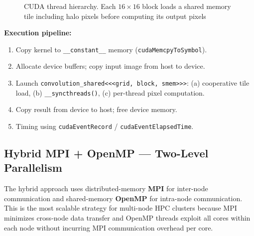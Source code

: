 ﻿\documentclass[12pt,a4paper]{article}
\begin{document}
\begin{figure}[H]

\caption{
CUDA thread hierarchy. Each $16 \times 16$ block loads a shared memory
tile including halo pixels before computing its output pixels
}

\label{fig:cuda}
\end{figure}

\textbf{Execution pipeline:}
\begin{enumerate}
  \item Copy kernel to \texttt{\_\_constant\_\_} memory
        (\texttt{cudaMemcpyToSymbol}).
  \item Allocate device buffers; copy input image from host to device.
  \item Launch \texttt{convolution\_shared<<<grid, block, smem>>>}:
        (a) cooperative tile load, (b) \texttt{\_\_syncthreads()},
        (c) per-thread pixel computation.
  \item Copy result from device to host; free device memory.
  \item Timing using \texttt{cudaEventRecord} / \texttt{cudaEventElapsedTime}.
\end{enumerate}

\subsection{Hybrid MPI + OpenMP --- Two-Level Parallelism}
\label{sec:hybrid}

The hybrid approach uses distributed-memory \textbf{MPI} for inter-node communication and shared-memory \textbf{OpenMP} for intra-node communication. This is the most scalable strategy
for multi-node HPC clusters because MPI minimizes cross-node data transfer and OpenMP threads exploit all cores within each node without incurring MPI
communication overhead per core.
\end{document}
